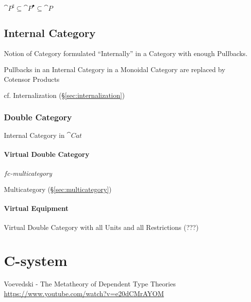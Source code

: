 $\cat{P}^\sharp \subseteq \cat{P}^\bullet \subseteq \cat{P}$



\subsection{Internal Category}\label{sec:internal_category}

Notion of Category formulated ``Internally'' in a Category with enough
Pullbacks.

Pullbacks in an Internal Category in a Monoidal Category are replaced
by Cotensor Products

\fist cf. Internalization (\S\ref{sec:internalization})



\subsubsection{Double Category}\label{sec:double_category}

Internal Category in $\cat{Cat}$



\paragraph{Virtual Double Category}\label{sec:virtual_double_category}\hfill

\emph{$fc$-multicategory}

Multicategory (\S\ref{sec:multicategory})



\paragraph{Virtual Equipment}\label{sec:virtual_equipment}\hfill

Virtual Double Category with all Units and all Restrictions (???)



\section{C-system}\label{sec:c_system}

Voevedski - The Metatheory of Dependent Type Theories
\url{https://www.youtube.com/watch?v=e20dCMrAYOM}

